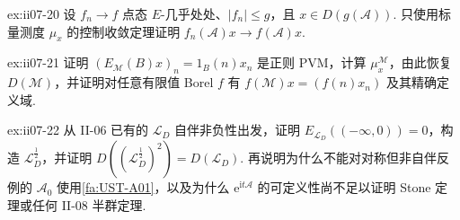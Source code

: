 \begin{FAExercise}[谱控制收敛]{ex:ii07-20}
设 \(\displaystyle f_n\to f\) 点态 \(\displaystyle E\)-几乎处处、\(\displaystyle|f_n|\leqslant g\)，且 \(\displaystyle x\in D(g(\mathcal A))\). 只使用标量测度 \(\displaystyle\mu_x\) 的控制收敛定理证明 \(\displaystyle f_n(\mathcal A)x\to f(\mathcal A)x\).
\end{FAExercise}

\begin{FAExercise}[无界乘法算子模型的投影值测度与完整可测演算]{ex:ii07-21}
证明 \(\displaystyle(E_{\mathcal M}(B)x)_n=1_B(n)x_n\) 是正则 PVM，计算 \(\displaystyle\mu_x^{\mathcal M}\)，由此恢复 \(\displaystyle D(\mathcal M)\)，并证明对任意有限值 Borel \(\displaystyle f\) 有 \(\displaystyle f(\mathcal M)x=(f(n)x_n)\) 及其精确定义域.
\end{FAExercise}

\begin{FAExercise}{ex:ii07-22}
从 II-06 已有的 \(\displaystyle\mathcal L_D\) 自伴非负性出发，证明 \(\displaystyle E_{\mathcal L_D}(( -\infty,0))=0\)，构造 \(\displaystyle\mathcal L_D^{\frac{1}{2}}\)，并证明 \(\displaystyle D((\mathcal L_D^{\frac{1}{2}})^2)=D(\mathcal L_D)\). 再说明为什么不能对对称但非自伴反例的 \(\displaystyle\mathcal A_0\) 使用\autoref{fa:UST-A01}，以及为什么 \(\displaystyle\mathrm{e}^{\mathrm{i}t\mathcal A}\) 的可定义性尚不足以证明 Stone 定理或任何 II-08 半群定理.
\end{FAExercise}
